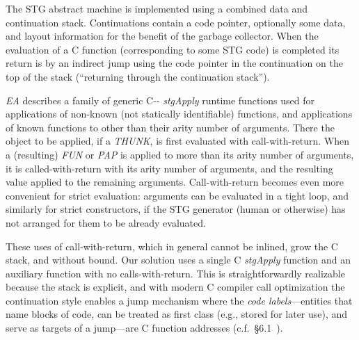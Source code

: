 \documentclass{llncs}
\begin{document}
The STG abstract machine is implemented using a combined data and continuation stack.
Continuations contain a code pointer, optionally some data, and layout
information for the benefit of the garbage collector.  
When the evaluation of a C function (corresponding to some STG code) is
completed its return is by an indirect jump using the code pointer in the
continuation on the top of the stack (``returning through the continuation
stack'').

\emph{EA} describes a family of generic C-{}- \emph{stgApply} runtime
functions used for applications of non-known (not statically identifiable)
functions, and applications of known functions to other than their arity
number of arguments.  There the object to be applied, if a \emph{THUNK}, is
first evaluated with call-with-return.  When a (resulting) \emph{FUN} or
\emph{PAP} is applied to more than its arity number of arguments, it is
called-with-return with its arity number of arguments, and the resulting value
applied to the remaining arguments.
%
Call-with-return becomes even more convenient for strict evaluation: arguments
can be evaluated in a tight loop, and similarly for strict constructors, if
the STG generator (human or otherwise) has not arranged for them to be already
evaluated.

These uses of call-with-return, which in general cannot be inlined, grow the C
stack, and without bound.  Our solution uses a single C \emph{stgApply}
function and an auxiliary function with no calls-with-return.  This is
straightforwardly realizable because the stack is explicit, and with modern C
compiler call optimization the continuation style enables a jump mechanism
where the \emph{code labels}---entities that name blocks of code, can be
treated as first class (e.g., stored for later use), and serve as targets of a
jump---are C function addresses (c.f.\ \S 6.1~\cite{PJ-stockhardware}).
\end{document}
